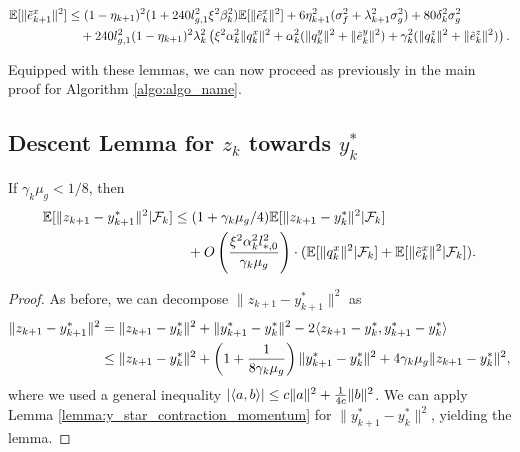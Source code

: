 \begin{lemma}
    \label{lemma:descent_stochastic_noise_x}
    \begin{align*}
        \mathbb{E}[\| \tilde{e}_{k+1}^x\|^2] &\le (1 - \eta_{k+1})^2 (1 + 240 l_{g,1}^2 \xi^2 \beta_k^2) \mathbb{E}[\|\tilde{e}_{k}^x\|^2 ] + 6\eta_{k+1}^2 (\sigma_f^2 + \lambda_{k+1}^2 \sigma_g^2) + 80 \delta_k^2 \sigma_g^2 \\
        &\quad + 240 l_{g,1}^2 (1-\eta_{k+1})^2 \lambda_k^2 \left(\xi^2 \alpha_k^2 \|q_k^x\|^2 + \alpha_k^2 (\|q_k^y\|^2 + \|\tilde{e}_k^y\|^2) + \gamma_k^2 (\|q_k^z\|^2 + \|\tilde{e}_k^z\|^2) \right). 
    \end{align*}
\end{lemma}
Equipped with these lemmas, we can now proceed as previously in the main proof for Algorithm \ref{algo:algo_name}. 

\subsection{Descent Lemma for $z_k$ towards $y_k^*$}
\begin{lemma}
    \label{lemma:z_descent_1}
    If $\gamma_k \mu_g < 1/8$, then
    \begin{align*}
        \mathbb{E}[\|z_{k+1} - y_{k+1}^*\|^2 | \mathcal{F}_k] &\le (1 + \gamma_k \mu_g / 4) \mathbb{E}[\|z_{k+1} - y_k^*\|^2 | \mathcal{F}_k] \\
        &\quad + O\left( \frac{\xi^2 \alpha_k^2 l_{*,0}^2}{\gamma_k \mu_g} \right) \cdot (\mathbb{E}[\|q_k^x\|^2 | \mathcal{F}_k] + \mathbb{E}[\|\tilde{e}_k^x\|^2 | \mathcal{F}_k]). 
    \end{align*}
\end{lemma}
\begin{proof}
    As before, we can decompose $\|z_{k+1} - y_{k+1}^*\|^2$ as
    \begin{align*}
        \|z_{k+1} - y_{k+1}^*\|^2 &= \|z_{k+1} - y_k^*\|^2 + \|y_{k+1}^* - y_k^*\|^2 - 2\langle z_{k+1}-y_k^*, y_{k+1}^* - y_k^* \rangle \\
        &\le \|z_{k+1} - y_k^*\|^2 + \left(1 + \frac{1}{8\gamma_k \mu_g} \right) \|y_{k+1}^* - y_k^*\|^2 + 4\gamma_k \mu_g \|z_{k+1}-y_k^*\|^2,
    \end{align*}
    where we used a general inequality $|\langle a, b \rangle| \le c\|a\|^2 + \frac{1}{4c} \|b\|^2$.
    We can apply Lemma \ref{lemma:y_star_contraction_momentum} for $\|y_{k+1}^* - y_k^*\|^2$, yielding the lemma. 
\end{proof}




